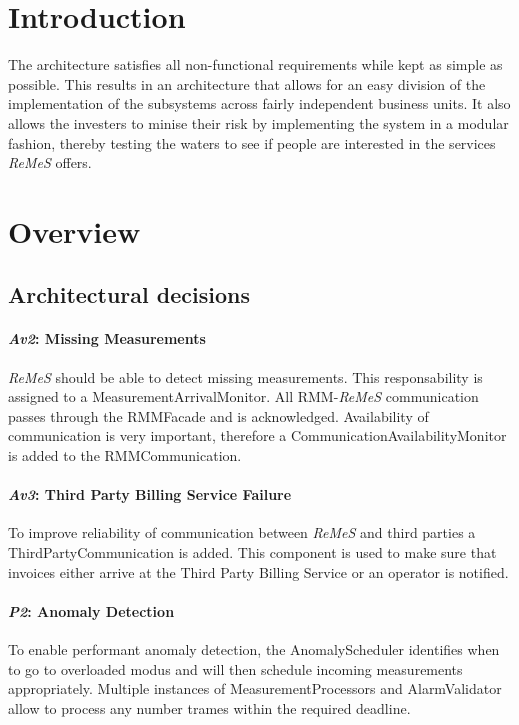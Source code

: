 \documentclass[a4paper,10pt]{article}
\newcommand{\rem}{\emph{ReMeS}\xspace}
\begin{document}


\tableofcontents
\listoffigures
\newpage

\section{Introduction}\label{sec:introduction}
The architecture satisfies all non-functional requirements while kept as simple as possible. This results in an architecture that allows for an easy division of the implementation of the subsystems across fairly independent business units. It also allows the investers to minise their risk by implementing the system in a modular fashion, thereby testing the waters to see if people are interested in the services \rem offers.

\section{Overview}\label{sec:overview}
\subsection{Architectural decisions}

\paragraph{\emph{Av2}: Missing Measurements}
\rem should be able to detect missing measurements. This responsability is assigned to a MeasurementArrivalMonitor. All RMM-\rem communication passes through the RMMFacade and is acknowledged. Availability of communication is very important, therefore a CommunicationAvailabilityMonitor is added to the RMMCommunication.

\paragraph{\emph{Av3}: Third Party Billing Service Failure}
To improve reliability of communication between \rem and third parties a ThirdPartyCommunication is added. This component is used to make sure that invoices either arrive at the Third Party Billing Service or an operator is notified.

\paragraph{\emph{P2}: Anomaly Detection}
To enable performant anomaly detection, the AnomalyScheduler identifies when to go to overloaded modus and will then schedule incoming measurements appropriately. Multiple instances of MeasurementProcessors and AlarmValidator allow to process any number trames within the required deadline.
\end{document}
